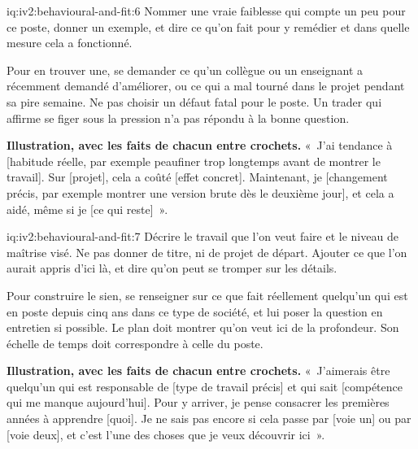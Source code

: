 \begin{solution}{iq:iv2:behavioural-and-fit:6}
Nommer une vraie faiblesse qui compte un peu pour ce poste, donner un exemple, et dire ce qu'on fait pour y remédier et dans quelle mesure cela a fonctionné.

Pour en trouver une, se demander ce qu'un collègue ou un enseignant a récemment demandé d'améliorer, ou ce qui a mal tourné dans le projet pendant sa pire semaine. Ne pas choisir un défaut fatal pour le poste. Un trader qui affirme se figer sous la pression n'a pas répondu à la bonne question.

\textbf{Illustration, avec les faits de chacun entre crochets.} «~J'ai tendance à [habitude réelle, par exemple peaufiner trop longtemps avant de montrer le travail]. Sur [projet], cela a coûté [effet concret]. Maintenant, je [changement précis, par exemple montrer une version brute dès le deuxième jour], et cela a aidé, même si je [ce qui reste]~».

\end{solution}

\begin{solution}{iq:iv2:behavioural-and-fit:7}
Décrire le travail que l'on veut faire et le niveau de maîtrise visé. Ne pas donner de titre, ni de projet de départ. Ajouter ce que l'on aurait appris d'ici là, et dire qu'on peut se tromper sur les détails.

Pour construire le sien, se renseigner sur ce que fait réellement quelqu'un qui est en poste depuis cinq ans dans ce type de société, et lui poser la question en entretien si possible. Le plan doit montrer qu'on veut ici de la profondeur. Son échelle de temps doit correspondre à celle du poste.

\textbf{Illustration, avec les faits de chacun entre crochets.} «~J'aimerais être quelqu'un qui est responsable de [type de travail précis] et qui sait [compétence qui me manque aujourd'hui]. Pour y arriver, je pense consacrer les premières années à apprendre [quoi]. Je ne sais pas encore si cela passe par [voie un] ou par [voie deux], et c'est l'une des choses que je veux découvrir ici~».

\end{solution}

